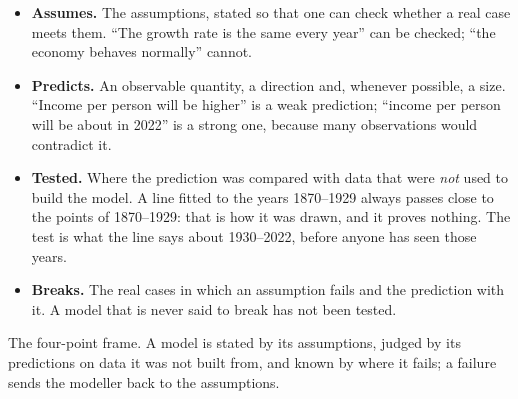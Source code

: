 \begin{itemize}
\item \textbf{Assumes.} The assumptions, stated so that one can check whether a real case meets
  them. ``The growth rate is the same every year'' can be checked; ``the economy behaves normally''
  cannot.
\item \textbf{Predicts.} An observable quantity, a direction and, whenever possible, a size. ``Income
  per person will be higher'' is a weak prediction; ``income per person will be about
   in 2022'' is a strong one, because many observations would contradict it.
\item \textbf{Tested.} Where the prediction was compared with data that were \emph{not} used to
  build the model. A line fitted to the years 1870--1929 always passes close to the points of
  1870--1929: that is how it was drawn, and it proves nothing. The test is what the line says about
  1930--2022, before anyone has seen those years.
\item \textbf{Breaks.} The real cases in which an assumption fails and the prediction with it. A
  model that is never said to break has not been tested.
\end{itemize}

\begin{omfigure}

{\small The four-point frame. A model is stated by its assumptions, judged by its predictions on data
it was not built from, and known by where it fails; a failure sends the modeller back to the
assumptions.}
\end{omfigure}

